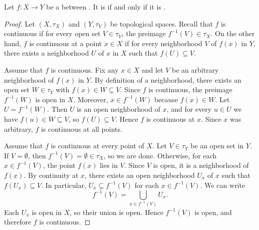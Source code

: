\begin{lemma} \label{lemma:function_between_topological_spaces_is_continuous_iff_continuous_at_all_points}
    Let $f: X \to Y$ be a  between . It is  if and only if it is .
\end{lemma}
\begin{proof}
    Let $(X, \tau_X)$ and $(Y, \tau_Y)$ be topological spaces. Recall that $f$ is continuous if for every open set $V \in \tau_Y$, the preimage $f^{-1}(V) \in \tau_X$. On the other hand, $f$ is continuous at a point $x \in X$ if for every neighborhood $V$ of $f(x)$ in $Y$, there exists a neighborhood $U$ of $x$ in $X$ such that $f(U) \subseteq V$.

    Assume that $f$ is continuous. Fix any $x \in X$ and let $V$ be an arbitrary neighborhood of $f(x)$ in $Y$. By definition of a neighborhood, there exists an open set $W \in \tau_Y$ with $f(x) \in W \subseteq V$. Since $f$ is continuous, the preimage $f^{-1}(W)$ is open in $X$. Moreover, $x \in f^{-1}(W)$ because $f(x) \in W$. Let $U = f^{-1}(W)$. Then $U$ is an open neighborhood of $x$, and for every $u \in U$ we have $f(u) \in W \subseteq V$, so $f(U) \subseteq V$. Hence $f$ is continuous at $x$. Since $x$ was arbitrary, $f$ is continuous at all points.

    Assume that $f$ is continuous at every point of $X$. Let $V \in \tau_Y$ be an open set in $Y$. If $V = \emptyset$, then $f^{-1}(V) = \emptyset \in \tau_X$, so we are done. Otherwise, for each $x \in f^{-1}(V)$, the point $f(x)$ lies in $V$. Since $V$ is open, it is a neighborhood of $f(x)$. By continuity at $x$, there exists an open neighborhood $U_x$ of $x$ such that $f(U_x) \subseteq V$. In particular, $U_x \subseteq f^{-1}(V)$ for each $x \in f^{-1}(V)$. We can write
    $$f^{-1}(V) = \bigcup_{x \in f^{-1}(V)} U_x.$$
    Each $U_x$ is open in $X$, so their union is open. Hence $f^{-1}(V)$ is open, and therefore $f$ is continuous.
\end{proof}